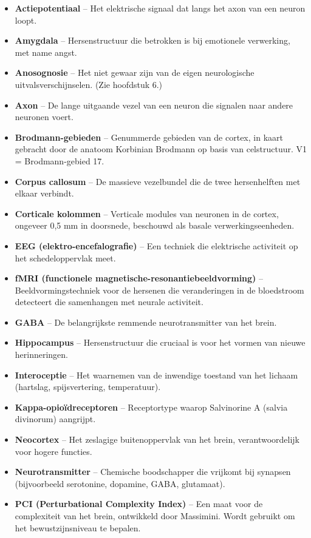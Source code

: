 \documentclass[11pt, twoside, openright]{book}
\begin{document}
\begin{itemize}
  \item \textbf{Actiepotentiaal} -- Het elektrische signaal dat langs het axon van een neuron loopt.
  \item \textbf{Amygdala} -- Hersenstructuur die betrokken is bij emotionele verwerking, met name angst.
  \item \textbf{Anosognosie} -- Het niet gewaar zijn van de eigen neurologische uitvalsverschijnselen. (Zie hoofdstuk 6.)
  \item \textbf{Axon} -- De lange uitgaande vezel van een neuron die signalen naar andere neuronen voert.
  \item \textbf{Brodmann-gebieden} -- Genummerde gebieden van de cortex, in kaart gebracht door de anatoom Korbinian Brodmann op basis van celstructuur. V1 = Brodmann-gebied 17.
  \item \textbf{Corpus callosum} -- De massieve vezelbundel die de twee hersenhelften met elkaar verbindt.
  \item \textbf{Corticale kolommen} -- Verticale modules van neuronen in de cortex, ongeveer 0,5 mm in doorsnede, beschouwd als basale verwerkingseenheden.
  \item \textbf{EEG (elektro-encefalografie)} -- Een techniek die elektrische activiteit op het schedeloppervlak meet.
  \item \textbf{fMRI (functionele magnetische-resonantiebeeldvorming)} -- Beeldvormingstechniek voor de hersenen die veranderingen in de bloedstroom detecteert die samenhangen met neurale activiteit.
  \item \textbf{GABA} -- De belangrijkste remmende neurotransmitter van het brein.
  \item \textbf{Hippocampus} -- Hersenstructuur die cruciaal is voor het vormen van nieuwe herinneringen.
  \item \textbf{Interoceptie} -- Het waarnemen van de inwendige toestand van het lichaam (hartslag, spijsvertering, temperatuur).
  \item \textbf{Kappa-opioïdreceptoren} -- Receptortype waarop Salvinorine A (salvia divinorum) aangrijpt.
  \item \textbf{Neocortex} -- Het zeslagige buitenoppervlak van het brein, verantwoordelijk voor hogere functies.
  \item \textbf{Neurotransmitter} -- Chemische boodschapper die vrijkomt bij synapsen (bijvoorbeeld serotonine, dopamine, GABA, glutamaat).
  \item \textbf{PCI (Perturbational Complexity Index)} -- Een maat voor de complexiteit van het brein, ontwikkeld door Massimini. Wordt gebruikt om het bewustzijnsniveau te bepalen.

\end{itemize}
\end{document}
